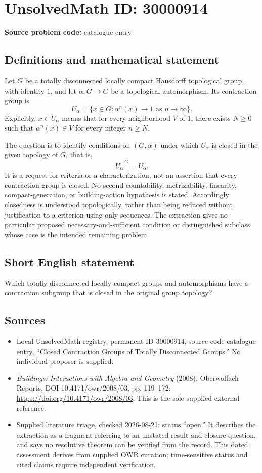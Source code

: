 \documentclass[11pt]{article}
\begin{document}
\section*{UnsolvedMath ID: 30000914}
\textbf{Source problem code:} catalogue entry
\subsection{Definitions and mathematical statement}
Let \(G\) be a totally disconnected locally compact Hausdorff topological group, with identity \(1\), and let \(\alpha:G\to G\) be a topological automorphism. Its contraction group is
\[
U_\alpha=\{x\in G:\alpha^n(x)\longrightarrow1\text{ as }n\to\infty\}.
\]
Explicitly, \(x\in U_\alpha\) means that for every neighborhood \(V\) of \(1\), there exists \(N\geq0\) such that \(\alpha^n(x)\in V\) for every integer \(n\geq N\).

The question is to identify conditions on \((G,\alpha)\) under which \(U_\alpha\) is closed in the given topology of \(G\), that is,
\[
\overline{U_\alpha}^{\,G}=U_\alpha.
\]
It is a request for criteria or a characterization, not an assertion that every contraction group is closed. No second-countability, metrizability, linearity, compact-generation, or building-action hypothesis is stated. Accordingly closedness is understood topologically, rather than being reduced without justification to a criterion using only sequences. The extraction gives no particular proposed necessary-and-sufficient condition or distinguished subclass whose case is the intended remaining problem.
\subsection{Short English statement}
Which totally disconnected locally compact groups and automorphisms have a contraction subgroup that is closed in the original group topology?
\subsection{Sources}
\begin{itemize}
\item Local UnsolvedMath registry, permanent ID \(30000914\), source code catalogue entry, ``Closed Contraction Groups of Totally Disconnected Groups.'' No individual proposer is supplied.
\item \emph{Buildings: Interactions with Algebra and Geometry} (2008), Oberwolfach Reports, DOI 10.4171/owr/2008/03, pp. 119--172: \url{https://doi.org/10.4171/owr/2008/03}. This is the sole supplied external reference.
\item Supplied literature triage, checked 2026-08-21: status ``open.'' It describes the extraction as a fragment referring to an unstated result and closure question, and says no resolutive theorem can be verified from the record. This dated assessment derives from supplied OWR curation; time-sensitive status and cited claims require independent verification.
\end{itemize}
\end{document}
